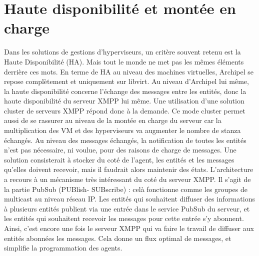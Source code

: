     
    \section{Haute disponibilité et montée en charge}
Dans les solutions de gestions d'hyperviseurs, un critère souvent retenu est la Haute Disponibilité (HA).
Mais tout le monde ne met pas les mêmes éléments derrière ces mots. En terme de HA au niveau des
machines virtuelles, Archipel se repose complètement et uniquement sur libvirt. Au niveau d'Archipel lui
même, la haute disponibilité concerne l'échange des messages entre les entités, donc la haute
disponibilité du serveur XMPP lui même. Une utilisation d'une solution cluster de serveurs XMPP répond
donc à la demande. Ce mode cluster permet aussi de se rassurer au niveau de la montée en charge du
serveur car la multiplication des VM et des hyperviseurs va augmenter le nombre de stanza échangés.\newline
Au niveau des messages échangés, la notification de toutes les entités n'est pas nécessaire, ni voulue,
pour des raisons de charge de messages. Une solution consisterait à stocker du coté de l'agent, les
entités et les messages qu'elles doivent recevoir, mais il faudrait alors maintenir des états. L'architecture
a recours à un mécanisme très intéressant du coté du serveur XMPP. Il s'agit de la partie PubSub (PUBlish-
SUBscribe) : celà fonctionne comme les groupes de multicast au niveau réseau IP. Les entités qui
souhaitent diffuser des informations à plusieurs entités publient via une entrée dans le service PubSub du
serveur, et les entités qui souhaitent recevoir les messages pour cette entrée s'y abonnent. Ainsi, c'est
encore une fois le serveur XMPP qui va faire le travail de diffuser aux entités abonnées les messages. Cela
donne un flux optimal de messages, et simplifie la programmation des agents.\newline

